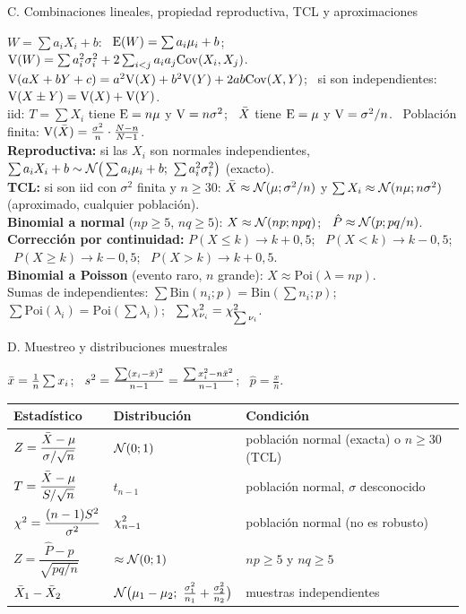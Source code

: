 {\begin{hoja}{C. Combinaciones lineales, propiedad reproductiva, TCL y aproximaciones}
\raggedright
$W=\sum a_iX_i+b$: \ $\mathrm{E}(W)=\sum a_i\mu_i+b$; \ $\mathrm{V}(W)=\sum a_i^2\sigma_i^2+2\sum_{i<j}a_ia_j\mathrm{Cov}(X_i,X_j)$.\\
$\mathrm{V}(aX+bY+c)=a^2\mathrm{V}(X)+b^2\mathrm{V}(Y)+2ab\mathrm{Cov}(X,Y)$; \ si son independientes: $\mathrm{V}(X\pm Y)=\mathrm{V}(X)+\mathrm{V}(Y)$.\\
iid: $T=\sum X_i$ tiene $\mathrm{E}=n\mu$ y $\mathrm{V}=n\sigma^2$; \ $\bar{X}$ tiene $\mathrm{E}=\mu$ y $\mathrm{V}=\sigma^2/n$. \ Población finita: $\mathrm{V}(\bar{X})=\frac{\sigma^2}n\cdot\frac{N-n}{N-1}$.\\
\textbf{Reproductiva:} si las $X_i$ son normales independientes, $\sum a_iX_i+b\sim\mathcal{N}\big(\sum a_i\mu_i+b;\ \sum a_i^2\sigma_i^2\big)$ (exacto).\\
\textbf{TCL:} si son iid con $\sigma^2$ finita y $n\ge30$: $\bar{X}\approx\mathcal{N}(\mu;\sigma^2/n)$ y $\sum X_i\approx\mathcal{N}(n\mu;n\sigma^2)$ (aproximado, cualquier población).\\
\textbf{Binomial a normal} ($np\ge5$, $nq\ge5$): $X\approx\mathcal{N}(np;npq)$; \ $\hat P\approx\mathcal{N}(p;pq/n)$.\\
\textbf{Corrección por continuidad:} $P(X\le k)\to k+0{,}5$; \ $P(X<k)\to k-0{,}5$; \ $P(X\ge k)\to k-0{,}5$; \ $P(X>k)\to k+0{,}5$.\\
\textbf{Binomial a Poisson} (evento raro, $n$ grande): $X\approx\mathrm{Poi}(\lambda=np)$.\\
Sumas de independientes: $\sum\mathrm{Bin}(n_i;p)=\mathrm{Bin}(\sum n_i;p)$; \ $\sum\mathrm{Poi}(\lambda_i)=\mathrm{Poi}(\sum\lambda_i)$; \ $\sum\chi^2_{\nu_i}=\chi^2_{\sum\nu_i}$.
\end{hoja}

\begin{hoja}{D. Muestreo y distribuciones muestrales}
\raggedright
$\bar{x}=\frac1n\sum x_i$; \ $s^2=\frac{\sum(x_i-\bar{x})^2}{n-1}=\frac{\sum x_i^2-n\bar{x}^2}{n-1}$; \ $\hat p=\frac{x}{n}$.\\[3pt]
\renewcommand{\arraystretch}{1.7}
\begin{tabular}{@{}lll@{}}
\toprule
Estadístico & Distribución & Condición\\\midrule
$Z=\dfrac{\bar{X}-\mu}{\sigma/\sqrt n}$ & $\mathcal{N}(0;1)$ & población normal (exacta) o $n\ge30$ (TCL)\\
$T=\dfrac{\bar{X}-\mu}{S/\sqrt n}$ & $t_{n-1}$ & población normal, $\sigma$ desconocido\\
$\chi^2=\dfrac{(n-1)S^2}{\sigma^2}$ & $\chi^2_{n-1}$ & población normal (no es robusto)\\
$Z=\dfrac{\hat P-p}{\sqrt{pq/n}}$ & $\approx\mathcal{N}(0;1)$ & $np\ge5$ y $nq\ge5$\\
$\bar{X}_1-\bar{X}_2$ & $\Nor\big(\mu_1-\mu_2;\ \frac{\sigma_1^2}{n_1}+\frac{\sigma_2^2}{n_2}\big)$ & muestras independientes\\
\bottomrule
\end{tabular}
\end{hoja}

}
